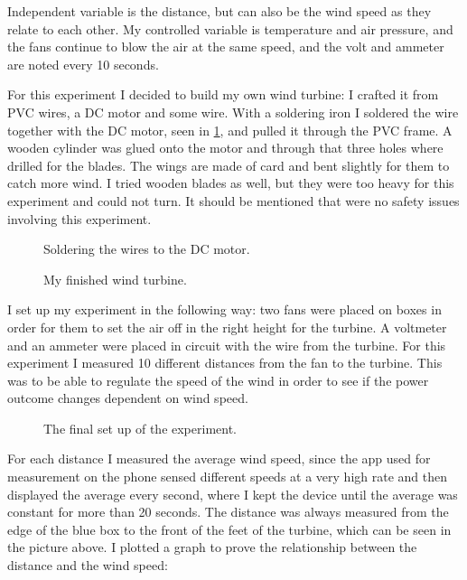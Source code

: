 \documentclass[12pt]{article}
\begin{document}
Independent variable is the distance, but can also be the wind speed as they relate to each other.
My controlled variable is temperature and air pressure, and the fans continue to blow the air at the same speed, and the volt and ammeter are noted every 10 seconds.

For this experiment I decided to build my own wind turbine: I crafted it from PVC wires, a DC motor and some wire.
With a soldering iron I soldered the wire together with the DC motor, seen in \ref{figure:soldering}, and pulled it through the PVC frame.
A wooden cylinder was glued onto the motor and through that three holes where drilled for the blades.
The wings are made of card and bent slightly for them to catch more wind.
I tried wooden blades as well, but they were too heavy for this experiment and could not turn.
It should be mentioned that were no safety issues involving this experiment.

\begin{figure}
  \centering
  \caption{Soldering the wires to the DC motor.}
  \label{figure:soldering}
\end{figure}
\begin{figure}
  \centering
  \caption{My finished wind turbine.}
  \label{figure:MyWindTurbine}
\end{figure}

I set up my experiment in the following way: two fans were placed on boxes in order for them to set the air off in the right height for the turbine.
A voltmeter and an ammeter were placed in circuit with the wire from the turbine.
For this experiment I measured 10 different distances from the fan to the turbine.
This was to be able to regulate the speed of the wind in order to see if the power outcome changes dependent on wind speed.

\begin{figure}
  \centering
  \caption{The final set up of the experiment.}
  \label{figure:FinalSetup}
\end{figure}

For each distance I measured the average wind speed, since the app used for measurement on the phone sensed different speeds at a very high rate and then displayed the average every second, where I kept the device until the average was constant for more than 20 seconds.
The distance was always measured from the edge of the blue box to the front of the feet of the turbine, which can be seen in the picture above.
I plotted a graph to prove the relationship between the distance and the wind speed:
\end{document}
